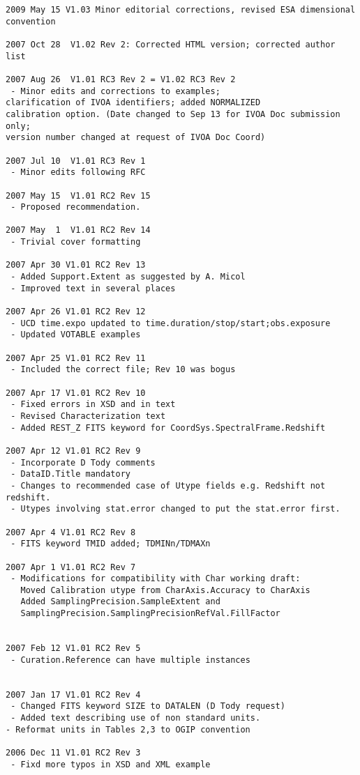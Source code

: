 \documentclass[11pt]{article}
\begin{document}
\begin{verbatim}
2009 May 15 V1.03 Minor editorial corrections, revised ESA dimensional convention

2007 Oct 28  V1.02 Rev 2: Corrected HTML version; corrected author list

2007 Aug 26  V1.01 RC3 Rev 2 = V1.02 RC3 Rev 2
 - Minor edits and corrections to examples;
clarification of IVOA identifiers; added NORMALIZED
calibration option. (Date changed to Sep 13 for IVOA Doc submission only;
version number changed at request of IVOA Doc Coord)

2007 Jul 10  V1.01 RC3 Rev 1
 - Minor edits following RFC

2007 May 15  V1.01 RC2 Rev 15
 - Proposed recommendation.

2007 May  1  V1.01 RC2 Rev 14
 - Trivial cover formatting

2007 Apr 30 V1.01 RC2 Rev 13
 - Added Support.Extent as suggested by A. Micol
 - Improved text in several places

2007 Apr 26 V1.01 RC2 Rev 12
 - UCD time.expo updated to time.duration/stop/start;obs.exposure
 - Updated VOTABLE examples

2007 Apr 25 V1.01 RC2 Rev 11
 - Included the correct file; Rev 10 was bogus

2007 Apr 17 V1.01 RC2 Rev 10
 - Fixed errors in XSD and in text
 - Revised Characterization text
 - Added REST_Z FITS keyword for CoordSys.SpectralFrame.Redshift

2007 Apr 12 V1.01 RC2 Rev 9
 - Incorporate D Tody comments
 - DataID.Title mandatory
 - Changes to recommended case of Utype fields e.g. Redshift not redshift.
 - Utypes involving stat.error changed to put the stat.error first.

2007 Apr 4 V1.01 RC2 Rev 8
 - FITS keyword TMID added; TDMINn/TDMAXn

2007 Apr 1 V1.01 RC2 Rev 7
 - Modifications for compatibility with Char working draft:
   Moved Calibration utype from CharAxis.Accuracy to CharAxis
   Added SamplingPrecision.SampleExtent and
   SamplingPrecision.SamplingPrecisionRefVal.FillFactor
   
 
2007 Feb 12 V1.01 RC2 Rev 5
 - Curation.Reference can have multiple instances


2007 Jan 17 V1.01 RC2 Rev 4
 - Changed FITS keyword SIZE to DATALEN (D Tody request)
 - Added text describing use of non standard units.
- Reformat units in Tables 2,3 to OGIP convention

2006 Dec 11 V1.01 RC2 Rev 3
 - Fixd more typos in XSD and XML example


\end{verbatim}
\end{document}
